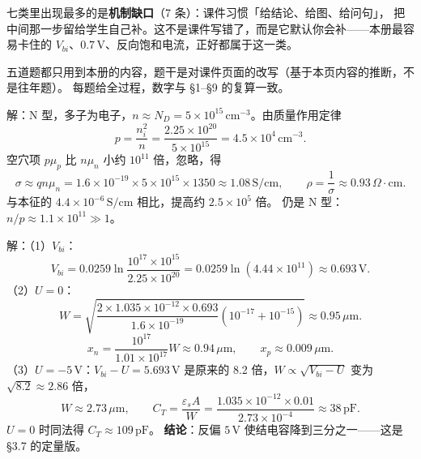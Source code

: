 \documentclass[11pt]{ctexart}
\begin{document}
七类里出现最多的是\textbf{机制缺口}（7 条）：课件习惯「给结论、给图、给问句」，
把中间那一步留给学生自己补。这不是课件写错了，而是它默认你会补——本册最容易卡住的
$V_{bi}$、$0.7\,\mathrm{V}$、反向饱和电流，正好都属于这一类。


五道题都只用到本册的内容，题干是对课件页面的改写（基于本页内容的推断，不是往年题）。
每题给全过程，数字与 §1--§9 的复算一致。



解：N 型，多子为电子，$n\approx N_D=5\times10^{15}\,\mathrm{cm^{-3}}$。由质量作用定律
\[
p=\frac{n_i^2}{n}=\frac{2.25\times10^{20}}{5\times10^{15}}=4.5\times10^{4}\,\mathrm{cm^{-3}}.
\]
空穴项 $p\mu_p$ 比 $n\mu_n$ 小约 $10^{11}$ 倍，忽略，得
\[
\sigma\approx qn\mu_n=1.6\times10^{-19}\times5\times10^{15}\times1350
\approx1.08\,\mathrm{S/cm},
\qquad
\rho=\frac{1}{\sigma}\approx0.93\,\Omega\cdot\mathrm{cm}.
\]
与本征的 $4.4\times10^{-6}\,\mathrm{S/cm}$ 相比，提高约 $2.5\times10^{5}$ 倍。
仍是 N 型：$n/p\approx1.1\times10^{11}\gg1$。



解：（1）$V_{bi}$：
\[
V_{bi}=0.0259\ln\frac{10^{17}\times10^{15}}{2.25\times10^{20}}
=0.0259\ln\left(4.44\times10^{11}\right)\approx0.693\,\mathrm{V}.
\]
（2）$U=0$：
\[
W=\sqrt{\frac{2\times1.035\times10^{-12}\times0.693}{1.6\times10^{-19}}
\left(10^{-17}+10^{-15}\right)}\approx0.95\,\mu\mathrm{m}.
\]
\[
x_n=\frac{10^{17}}{1.01\times10^{17}}W\approx0.94\,\mu\mathrm{m},\qquad
x_p\approx0.009\,\mu\mathrm{m}.
\]
（3）$U=-5\,\mathrm{V}$：$V_{bi}-U=5.693\,\mathrm{V}$ 是原来的 8.2 倍，$W\propto\sqrt{V_{bi}-U}$
变为 $\sqrt{8.2}\approx2.86$ 倍，
\[
W\approx2.73\,\mu\mathrm{m},\qquad
C_T=\frac{\varepsilon_sA}{W}=\frac{1.035\times10^{-12}\times0.01}{2.73\times10^{-4}}
\approx38\,\mathrm{pF}.
\]
$U=0$ 时同法得 $C_T\approx109\,\mathrm{pF}$。
\textbf{结论}：反偏 $5\,\mathrm{V}$ 使结电容降到三分之一——这是 §3.7 的定量版。
\end{document}
